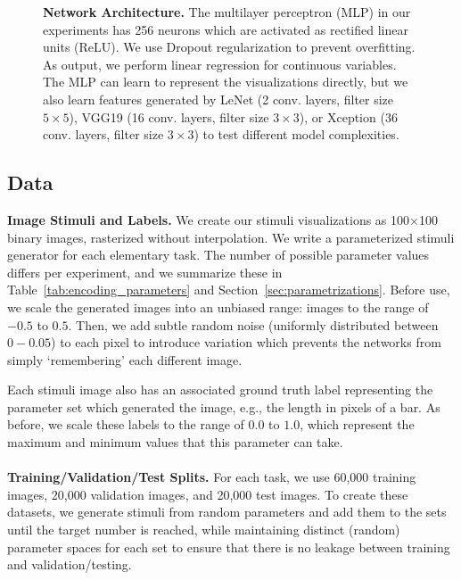 \begin{figure}[t]
	\centering
	
	\hfill

  \caption{\textbf{Network Architecture.} The multilayer perceptron (MLP) in our experiments has 256 neurons which are activated as rectified linear units (ReLU). We use Dropout regularization to prevent overfitting. As output, we perform linear regression for continuous variables. The MLP can learn to represent the visualizations directly, but we also learn features generated by LeNet (2 conv. layers, filter size $5\times5$), VGG19 (16 conv. layers, filter size $3\times3$), or Xception (36 conv. layers, filter size $3\times3$) to test different model complexities.}
	\label{fig:classifiers}
\end{figure}

\subsection{Data}
\label{sec:data}

\noindent\textbf{Image Stimuli and Labels.} 
We create our stimuli visualizations as 100$\times$100 binary images, rasterized without interpolation. We write a parameterized stimuli generator for each elementary task. The number of possible parameter values differs per experiment, and we summarize these in Table~\ref{tab:encoding_parameters} and Section~\ref{sec:parametrizations}. Before use, we scale the generated images into an unbiased range: images to the range of $-0.5$ to $0.5$. Then, we add subtle random noise (uniformly distributed between $0-0.05$) to each pixel to introduce variation which prevents the networks from simply `remembering' each different image.

Each stimuli image also has an associated ground truth label representing the parameter set which generated the image, e.g., the length in pixels of a bar. As before, we scale these labels to the range of $0.0$ to $1.0$, which represent the maximum and minimum values that this parameter can take.
\\~\\
\noindent\textbf{Training/Validation/Test Splits.} For each task, we use 60,000 training images, 20,000 validation images, and 20,000 test images. To create these datasets, we generate stimuli from random parameters and add them to the sets until the target number is reached, while maintaining distinct (random) parameter spaces for each set to ensure that there is no leakage between training and validation/testing.

